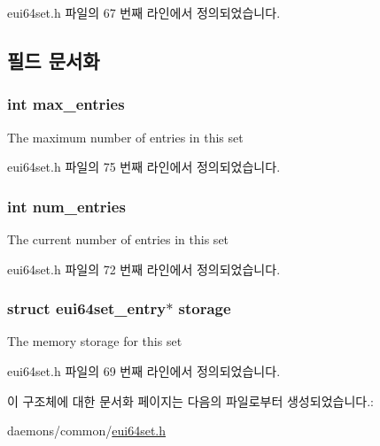 eui64set.\+h 파일의 67 번째 라인에서 정의되었습니다.



\subsection{필드 문서화}
\subsubsection[{\texorpdfstring{max\+\_\+entries}{max_entries}}]{\setlength{\rightskip}{0pt plus 5cm}int max\+\_\+entries}\hypertarget{structeui64set_aa71009e2224e8733f65e5d7c09f0a1a8}{}\label{structeui64set_aa71009e2224e8733f65e5d7c09f0a1a8}
The maximum number of entries in this set 

eui64set.\+h 파일의 75 번째 라인에서 정의되었습니다.

\subsubsection[{\texorpdfstring{num\+\_\+entries}{num_entries}}]{\setlength{\rightskip}{0pt plus 5cm}int num\+\_\+entries}\hypertarget{structeui64set_afb132bf5c80cf684818f5a032257faa3}{}\label{structeui64set_afb132bf5c80cf684818f5a032257faa3}
The current number of entries in this set 

eui64set.\+h 파일의 72 번째 라인에서 정의되었습니다.

\subsubsection[{\texorpdfstring{storage}{storage}}]{\setlength{\rightskip}{0pt plus 5cm}struct {\bf eui64set\+\_\+entry}$\ast$ storage}\hypertarget{structeui64set_a91b846e2ce1674f8b282c22afcbd7906}{}\label{structeui64set_a91b846e2ce1674f8b282c22afcbd7906}
The memory storage for this set 

eui64set.\+h 파일의 69 번째 라인에서 정의되었습니다.



이 구조체에 대한 문서화 페이지는 다음의 파일로부터 생성되었습니다.\+:\begin{DoxyCompactItemize}
\item 
daemons/common/\hyperlink{eui64set_8h}{eui64set.\+h}\end{DoxyCompactItemize}
